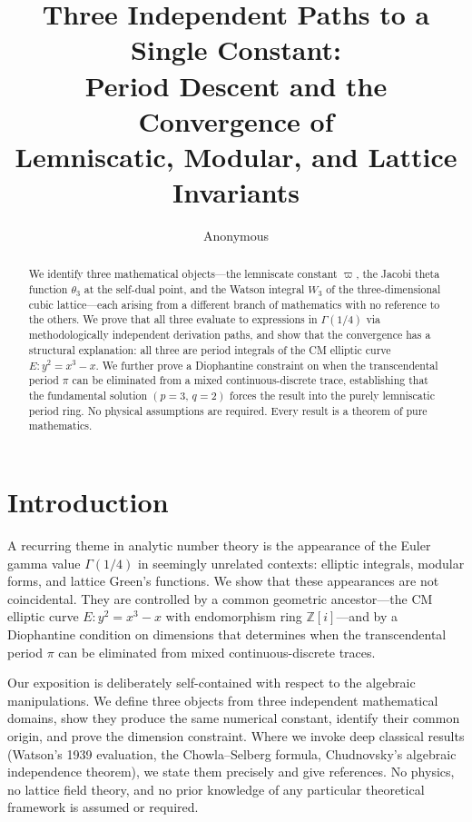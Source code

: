 \documentclass[12pt]{article}
\title{\textbf{Three Independent Paths to a Single Constant: \\[0.3cm]
Period Descent and the Convergence of \\
Lemniscatic, Modular, and Lattice Invariants}}
\author{Anonymous}
\date{}
\theoremstyle{definition}
\theoremstyle{remark}
\begin{document}
\maketitle

\begin{abstract}
\noindent We identify three mathematical objects---the lemniscate constant $\varpi$, the Jacobi theta function $\theta_3$ at the self-dual point, and the Watson integral $W_3$ of the three-dimensional cubic lattice---each arising from a different branch of mathematics with no reference to the others. We prove that all three evaluate to expressions in $\Gamma(1/4)$ via methodologically independent derivation paths, and show that the convergence has a structural explanation: all three are period integrals of the CM elliptic curve $E\!: y^2 = x^3 - x$. We further prove a Diophantine constraint on when the transcendental period $\pi$ can be eliminated from a mixed continuous-discrete trace, establishing that the fundamental solution $(p{=}3,\,q{=}2)$ forces the result into the purely lemniscatic period ring. No physical assumptions are required. Every result is a theorem of pure mathematics.
\end{abstract}

\tableofcontents

\section{Introduction}

A recurring theme in analytic number theory is the appearance of the Euler gamma value $\Gamma(1/4)$ in seemingly unrelated contexts: elliptic integrals, modular forms, and lattice Green's functions. We show that these appearances are not coincidental. They are controlled by a common geometric ancestor---the CM elliptic curve $E\!: y^2 = x^3 - x$ with endomorphism ring $\mathbb{Z}[i]$---and by a Diophantine condition on dimensions that determines when the transcendental period $\pi$ can be eliminated from mixed continuous-discrete traces.

Our exposition is deliberately self-contained with respect to the algebraic manipulations. We define three objects from three independent mathematical domains, show they produce the same numerical constant, identify their common origin, and prove the dimension constraint. Where we invoke deep classical results (Watson's 1939 evaluation, the Chowla--Selberg formula, Chudnovsky's algebraic independence theorem), we state them precisely and give references. No physics, no lattice field theory, and no prior knowledge of any particular theoretical framework is assumed or required.
\end{document}
